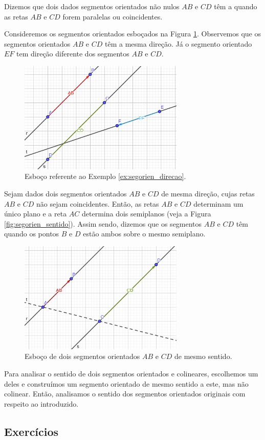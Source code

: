 Dizemos que dois dados segmentos orientados não nulos $AB$ e $CD$ têm a  quando as retas $AB$ e $CD$ forem paralelas ou coincidentes.

\begin{ex}\label{ex:segorien_direcao}
  Consideremos os segmentos orientados esboçados na Figura \ref{fig:ex_segorien_direcao}. Observemos que os segmentos orientados $AB$ e $CD$ têm a mesma direção. Já o segmento orientado $EF$ tem direção diferente dos segmentos $AB$ e $CD$.
  
  \begin{figure}[h!]
    \centering
    \includegraphics[width=0.7\textwidth]{./cap_vetor/dados/fig_ex_segorien_direcao/fig_ex_segorien_direcao}
  \caption{Esboço referente ao Exemplo \ref{ex:segorien_direcao}.}
  \label{fig:ex_segorien_direcao}
\end{figure}  
\end{ex}

Sejam dados dois segmentos orientados $AB$ e $CD$ de mesma direção, cujas retas $AB$ e $CD$ não sejam coincidentes. Então, as retas $AB$ e $CD$ determinam um único plano e a reta $AC$ determina dois semiplanos (veja a Figura \ref{fig:segorien_sentido}). Assim sendo, dizemos que os segmentos $AB$ e $CD$ têm  quando os pontos $B$ e $D$ estão ambos sobre o mesmo semiplano.

\begin{figure}[h!]
  \centering
  \includegraphics[width=0.7\textwidth]{./cap_vetor/dados/fig_segorien_sentido/fig_segorien_sentido}
  \caption{Esboço de dois segmentos orientados $AB$ e $CD$ de mesmo sentido.}
  \label{fig:seg_segorien_sentido}
\end{figure}

Para analisar o sentido de dois segmentos orientados e colineares, escolhemos um deles e construímos um segmento orientado de mesmo sentido a este, mas não colinear. Então, analisamos o sentido dos segmentos orientados originais com respeito ao introduzido.

\subsection{Exercícios}

\emconstrucao
